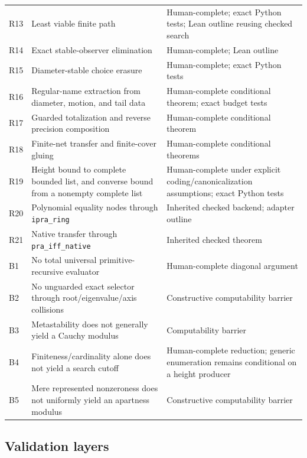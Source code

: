 \begin{longtable}{@{}p{}p{}p{}@{}}
R13 & Least viable finite path & Human-complete; exact Python tests; Lean outline reusing checked search \\
R14 & Exact stable-observer elimination & Human-complete; Lean outline \\
R15 & Diameter-stable choice erasure & Human-complete; exact Python tests \\
R16 & Regular-name extraction from diameter, motion, and tail data & Human-complete conditional theorem; exact budget tests \\
R17 & Guarded totalization and reverse precision composition & Human-complete conditional theorem \\
R18 & Finite-net transfer and finite-cover gluing & Human-complete conditional theorems \\
R19 & Height bound to complete bounded list, and converse bound from a nonempty complete list & Human-complete under explicit coding/canonicalization assumptions; exact Python tests \\
R20 & Polynomial equality nodes through \texttt{ipra\_ring} & Inherited checked backend; adapter outline \\
R21 & Native transfer through \texttt{pra\_iff\_native} & Inherited checked theorem \\
B1 & No total universal primitive-recursive evaluator & Human-complete diagonal argument \\
B2 & No unguarded exact selector through root/eigenvalue/axis collisions & Constructive computability barrier \\
B3 & Metastability does not generally yield a Cauchy modulus & Computability barrier \\
B4 & Finiteness/cardinality alone does not yield a search cutoff & Human-complete reduction; generic enumeration remains conditional on a height producer \\
B5 & Mere represented nonzeroness does not uniformly yield an apartness modulus & Constructive computability barrier \\
\bottomrule
\end{longtable}

\subsection{Validation layers}

